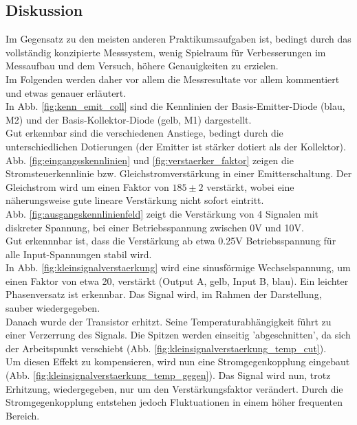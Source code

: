 \documentclass[12pt,a4paper]{article}
\begin{document}
\begin{multicols}{2}



\subsection{Diskussion}
Im Gegensatz zu den meisten anderen Praktikumsaufgaben ist, bedingt durch das vollständig konzipierte Messsystem, wenig Spielraum für Verbesserungen im Messaufbau und dem Versuch, höhere Genauigkeiten zu erzielen.\\
Im Folgenden werden daher vor allem die Messresultate vor allem kommentiert und etwas genauer erläutert.\\

In Abb. \ref{fig:kenn_emit_coll} sind die Kennlinien der Basis-Emitter-Diode (blau, M2) und der Basis-Kollektor-Diode (gelb, M1) dargestellt.\\
Gut erkennbar sind die verschiedenen Anstiege, bedingt durch die unterschiedlichen Dotierungen (der Emitter ist stärker dotiert als der Kollektor).\\

Abb. \ref{fig:eingangsskennlinien} und \ref{fig:verstaerker_faktor} zeigen die Stromsteuerkennlinie bzw. Gleichstromverstärkung in einer Emitterschaltung. Der Gleichstrom wird um einen Faktor von $185\pm 2$ verstärkt, wobei eine näherungsweise gute lineare Verstärkung nicht sofort eintritt.\\

Abb. \ref{fig:ausgangskennlinienfeld} zeigt die Verstärkung von 4 Signalen mit diskreter Spannung, bei einer Betriebsspannung zwischen 0V und 10V.\\
Gut erkennnbar ist, dass die Verstärkung ab etwa 0.25V Betriebsspannung für alle Input-Spannungen stabil wird.\\

In Abb. \ref{fig:kleinsignalverstaerkung} wird eine sinusförmige Wechselspannung, um einen Faktor von etwa 20, verstärkt (Output A, gelb, Input B, blau). Ein leichter Phasenversatz ist erkennbar. Das Signal wird, im Rahmen der Darstellung, sauber wiedergegeben.\\
Danach wurde der Transistor erhitzt. Seine Temperaturabhängigkeit führt zu einer Verzerrung des Signals. Die Spitzen werden einseitig 'abgeschnitten', da sich der Arbeitspunkt verschiebt (Abb. \ref{fig:kleinsignalverstaerkung_temp_cut}).\\
Um diesen Effekt zu kompensieren, wird nun eine Stromgegenkopplung eingebaut (Abb. \ref{fig:kleinsignalverstaerkung_temp_gegen}). Das Signal wird nun, trotz Erhitzung, wiedergegeben, nur um den Verstärkungsfaktor verändert. Durch die Stromgegenkopplung entstehen jedoch Fluktuationen in einem höher frequenten Bereich.\\


\end{multicols}
\end{document}

